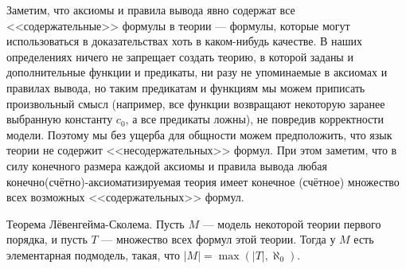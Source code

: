 Заметим, что аксиомы и правила вывода явно содержат все <<содержательные>> 
формулы в теории --- формулы, которые могут использоваться в доказательствах
хоть в каком-нибудь качестве. 
В наших определениях ничего не запрещает создать теорию, в которой 
заданы и дополнительные функции и предикаты, ни разу не упоминаемые в 
аксиомах и правилах вывода, но таким предикатам и 
функциям мы можем приписать произвольный смысл (например, все функции 
возвращают некоторую заранее выбранную константу $c_0$, а все предикаты 
ложны), не повредив корректности модели. Поэтому мы без ущерба для
общности можем предположить, что язык теории не содержит 
<<несодержательных>> формул.
При этом заметим, что в силу конечного размера каждой аксиомы и правила
вывода любая конечно(счётно)-аксиоматизируемая теория имеет
конечное (счётное) множество всех возможных <<содержательных>> формул.

\begin{theorem}{Теорема Лёвенгейма-Сколема.}
Пусть $M$ --- модель некоторой теории первого порядка, и пусть $T$ ---
множество всех формул этой теории. Тогда у $M$ есть элементарная
подмодель, такая, что $|M| = \max(|T|, \aleph_0)$.
\end{theorem}


